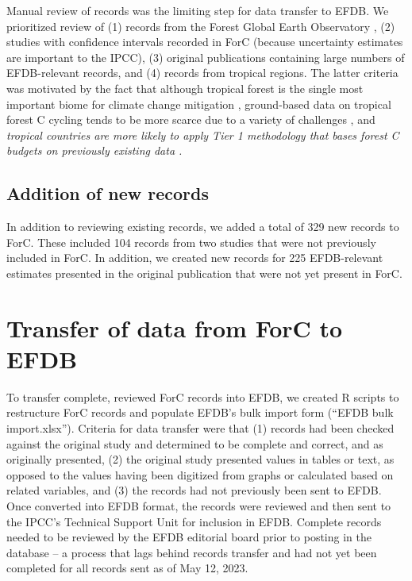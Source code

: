 \documentclass[, manuscript]{copernicus}
\begin{document}
Manual review of records was the limiting step for data transfer to
EFDB. We prioritized review of (1) records from the Forest Global Earth
Observatory
\citep[ForestGEO,][]{anderson-teixeira_ctfsforestgeo_2015, davies_forestgeo_2021},
(2) studies with confidence intervals recorded in ForC (because
uncertainty estimates are important to the IPCC), (3) original
publications containing large numbers of EFDB-relevant records, and (4)
records from tropical regions. The latter criteria was motivated by the
fact that although tropical forest is the single most important biome
for climate change mitigation \citep{refs}, ground-based data on
tropical forest C cycling tends to be more scarce due to a variety of
challenges \citep{refs, delima_making_2022}, and \emph{tropical
countries are more likely to apply Tier 1 methodology that bases forest
C budgets on previously existing data \citep{ref}.}

\subsection{Addition of new records}

In addition to reviewing existing records, we added a total of 329 new
records to ForC. These included 104 records from two studies
\citep{piponiot_distribution_2022, lutz_largediameter_2021} that were
not previously included in ForC. In addition, we created new records for
225 EFDB-relevant estimates presented in the original publication that
were not yet present in ForC.

\section{Transfer of data from ForC to EFDB}

To transfer complete, reviewed ForC records into EFDB, we created R
scripts to restructure ForC records and populate EFDB's bulk import form
(``EFDB bulk import.xlsx''). Criteria for data transfer were that (1)
records had been checked against the original study and determined to be
complete and correct, and as originally presented, (2) the original
study presented values in tables or text, as opposed to the values
having been digitized from graphs or calculated based on related
variables, and (3) the records had not previously been sent to EFDB.
Once converted into EFDB format, the records were reviewed and then sent
to the IPCC's Technical Support Unit for inclusion in EFDB. Complete
records needed to be reviewed by the EFDB editorial board prior to
posting in the database -- a process that lags behind records transfer
and had not yet been completed for all records sent as of May 12, 2023.
\end{document}
